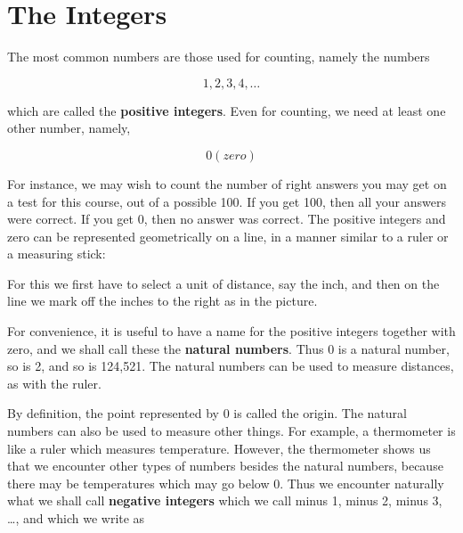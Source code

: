\documentclass[paper=a4,oneside,fontsize=12pt, parskip=full]{scrartcl}
\begin{document}
    \section{The Integers}\label{sec:the-integers}
    The most common numbers are those used for counting, namely the numbers

    \[1,2,3,4,\dots\]

    which are called the \textbf{positive integers}.
    Even for counting, we need at least one other number, namely,

    \[0(zero)\]

    For instance, we may wish to count the number of right answers you may
    get on a test for this course, out of a possible 100.
    If you get 100, then all your answers were correct.
    If you get 0, then no answer was correct.
    The positive integers and zero can be represented geometrically on a line,
    in a manner similar to a ruler or a measuring stick:

    \begin{center}
    \end{center}

    For this we first have to select a unit of distance, say the inch, and then on
    the line we mark off the inches to the right as in the picture.

    For convenience, it is useful to have a name for the positive integers
    together with zero, and we shall call these the \textbf{natural numbers}.
    Thus 0 is a natural number, so is 2, and so is 124,521.
    The natural numbers can be used to measure distances, as with the ruler.

    By definition, the point represented by 0 is called the origin.
    The natural numbers can also be used to measure other things.
    For example, a thermometer is like a ruler which measures temperature.
    However, the thermometer shows us that we encounter other types of numbers besides
    the natural numbers, because there may be temperatures which may go below 0.
    Thus we encounter naturally what we shall call \textbf{negative integers} which
    we call minus 1, minus 2, minus 3, \dots , and which we write as
\end{document}
